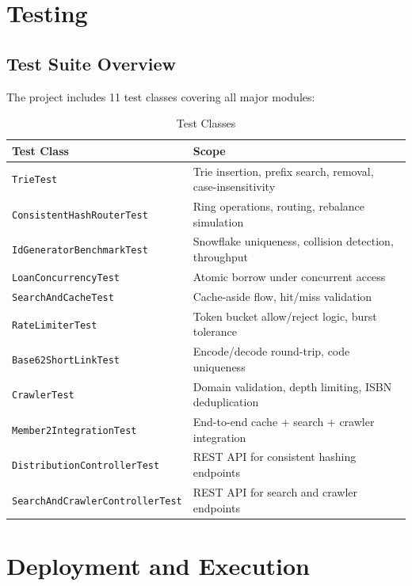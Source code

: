 \documentclass[12pt,a4paper]{report}
\begin{document}
\chapter{Testing}

\section{Test Suite Overview}
The project includes 11 test classes covering all major modules:

\begin{table}[H]
\centering
\caption{Test Classes}
\begin{tabularx}{\textwidth}{l X}
\toprule
\textbf{Test Class} & \textbf{Scope} \\
\midrule
\texttt{TrieTest} & Trie insertion, prefix search, removal, case-insensitivity \\
\texttt{ConsistentHashRouterTest} & Ring operations, routing, rebalance simulation \\
\texttt{IdGeneratorBenchmarkTest} & Snowflake uniqueness, collision detection, throughput \\
\texttt{LoanConcurrencyTest} & Atomic borrow under concurrent access \\
\texttt{SearchAndCacheTest} & Cache-aside flow, hit/miss validation \\
\texttt{RateLimiterTest} & Token bucket allow/reject logic, burst tolerance \\
\texttt{Base62ShortLinkTest} & Encode/decode round-trip, code uniqueness \\
\texttt{CrawlerTest} & Domain validation, depth limiting, ISBN deduplication \\
\texttt{Member2IntegrationTest} & End-to-end cache + search + crawler integration \\
\texttt{DistributionControllerTest} & REST API for consistent hashing endpoints \\
\texttt{SearchAndCrawlerControllerTest} & REST API for search and crawler endpoints \\
\bottomrule
\end{tabularx}
\end{table}


\chapter{Deployment and Execution}
\end{document}
